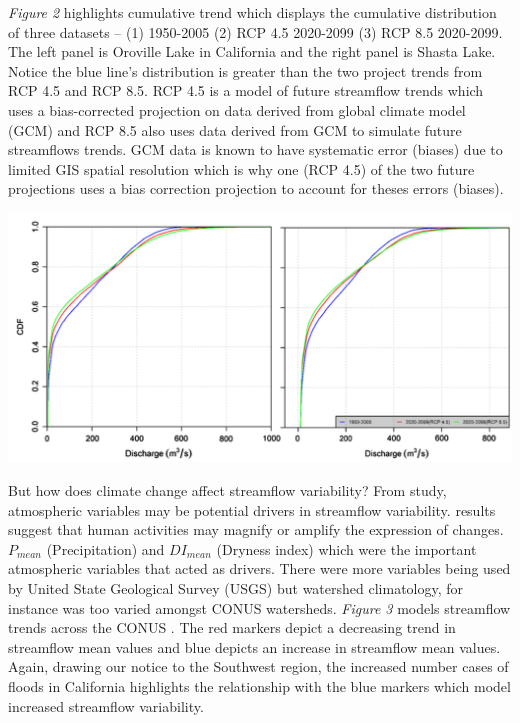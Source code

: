 \documentclass[a4paper,man,biblatex]{apa7}
\begin{document}
\vspace{2ex}
\par \textit{Figure 2} highlights cumulative trend which displays the cumulative distribution of three datasets -- (1) 1950-2005 (2) RCP 4.5 2020-2099 (3) RCP 8.5 2020-2099. The left panel is Oroville Lake in California and the right panel is Shasta Lake. Notice the blue line's distribution is greater than the two project trends from RCP 4.5 and RCP 8.5. RCP 4.5 is a model of future streamflow trends which uses a bias-corrected projection on data derived from global climate model (GCM) and RCP 8.5 also uses data derived from GCM to simulate future streamflows trends. GCM data is known to have systematic error (biases) due to limited GIS spatial resolution which is why one (RCP 4.5) of the two future projections uses a bias correction projection to account for theses errors (biases).\\
\begin{minipage}{0.65\linewidth}   
    \centering
    \includegraphics[scale=0.40]{cdf_streamflow.png}
\end{minipage}
\vspace{2ex}
\par But how does climate change affect streamflow variability? From \textcite{rice_2016} study, atmospheric variables may be potential drivers in streamflow variability. \textcite{rice_2016} results suggest that human activities may magnify or amplify the expression of changes. $P_\textit{mean}$ (Precipitation) and $DI_\textit{mean}$ (Dryness index) which were the important atmospheric variables that acted as drivers. There were more variables being used by United State Geological Survey (USGS) but watershed climatology, for instance was too varied amongst CONUS watersheds. \textit{Figure 3} models streamflow trends across the CONUS \autocite{rice_2016}. The red markers depict a decreasing trend in streamflow mean values and blue depicts an increase in streamflow mean values. Again, drawing our notice to the Southwest region, the increased number cases of floods in California highlights the relationship with the blue markers which model increased streamflow variability. \\
\end{document}
